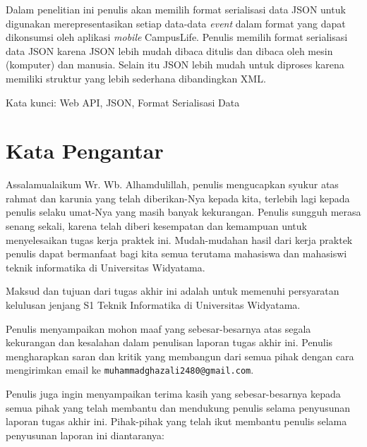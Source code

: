 \documentclass[a4paper, 12pt, oneside]{report}
\begin{document}
\onehalfspacing Dalam penelitian ini penulis akan memilih format serialisasi data JSON untuk digunakan merepresentasikan setiap data-data \textit{event} dalam format yang dapat dikonsumsi oleh aplikasi \textit{mobile} CampusLife. Penulis memilih format serialisasi data JSON karena JSON lebih mudah dibaca ditulis dan dibaca oleh mesin (komputer) dan manusia. Selain itu JSON lebih mudah untuk diproses karena memiliki struktur yang lebih sederhana dibandingkan XML\cite{json-fat-free}\cite{json-vs-xml-debate}.

\begin{flushleft}
\onehalfspacing Kata kunci: Web API, JSON, Format Serialisasi Data
\end{flushleft}

\chapter*{Kata Pengantar}

\onehalfspacing Assalamualaikum Wr. Wb. Alhamdulillah, penulis mengucapkan syukur atas rahmat dan karunia yang telah diberikan-Nya kepada kita, terlebih lagi kepada penulis selaku umat-Nya yang masih banyak kekurangan. Penulis sungguh merasa senang sekali, karena telah diberi kesempatan dan kemampuan untuk menyelesaikan tugas kerja praktek ini. Mudah-mudahan hasil dari kerja praktek penulis dapat bermanfaat bagi kita semua terutama mahasiswa dan mahasiswi teknik informatika di Universitas Widyatama.

\onehalfspacing Maksud dan tujuan dari tugas akhir ini adalah untuk memenuhi persyaratan kelulusan jenjang S1 Teknik Informatika di Universitas Widyatama.

\onehalfspacing Penulis menyampaikan mohon maaf yang sebesar-besarnya atas segala kekurangan dan kesalahan dalam penulisan laporan tugas akhir ini. Penulis mengharapkan saran dan kritik yang membangun dari semua pihak dengan cara mengirimkan email ke \texttt{muhammadghazali2480@gmail.com}.

\onehalfspacing Penulis juga ingin menyampaikan terima kasih yang sebesar-besarnya kepada semua pihak yang telah membantu dan mendukung penulis selama
penyusunan laporan tugas akhir ini. Pihak-pihak yang telah ikut membantu penulis selama penyusunan laporan ini diantaranya:
\end{document}
